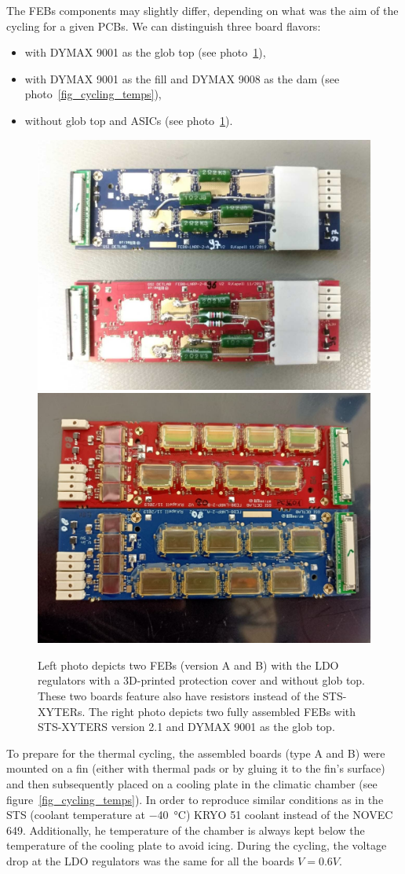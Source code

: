 The \gls{FEB}s components may slightly differ, depending on what was the aim of the cycling for a given \glspl{PCB}. We can distinguish three board flavors:
\begin{itemize}
    \item with DYMAX 9001 as the glob top (see photo~\ref{fig_noglobtop}),
    \item with DYMAX 9001 as the fill and DYMAX 9008 as the dam (see photo~\ref{fig_cycling_temps}), 
    \item without glob top and \glspl{ASIC} (see photo~\ref{fig_noglobtop}).
    \end{itemize}
\newpage
\begin{figure}[!h]
\centering
\includegraphics[width=0.45\columnwidth]{Chapter4/images/noglobtop.jpg}
\includegraphics[width=0.45\columnwidth]{Chapter4/images/globtop.jpg}
\caption{Left photo depicts two \glspl{FEB} (version A and B) with the \gls{LDO} regulators with a 3D-printed protection cover and without glob top. These two boards feature also have resistors instead of the STS-XYTERs.
The right photo depicts two fully assembled \gls{FEB}s with STS-XYTERS version 2.1 and DYMAX 9001 as the glob top.}
\label{fig_noglobtop}
\end{figure}

To prepare for the thermal cycling, the assembled boards (type A and B) were mounted on a fin (either with thermal pads or by gluing it to the fin's surface) and then subsequently placed on a cooling plate in the climatic chamber (see figure~\ref{fig_cycling_temps}). In order to reproduce similar conditions as in the \gls{STS} (coolant temperature at \SI{-40}{\celsius}) KRYO 51 coolant instead of the NOVEC 649. Additionally, he temperature of the chamber is always kept below the temperature of the cooling plate to avoid icing. During the cycling, the voltage drop at the \gls{LDO} regulators was the same for all the boards $V=0.6V$. 

